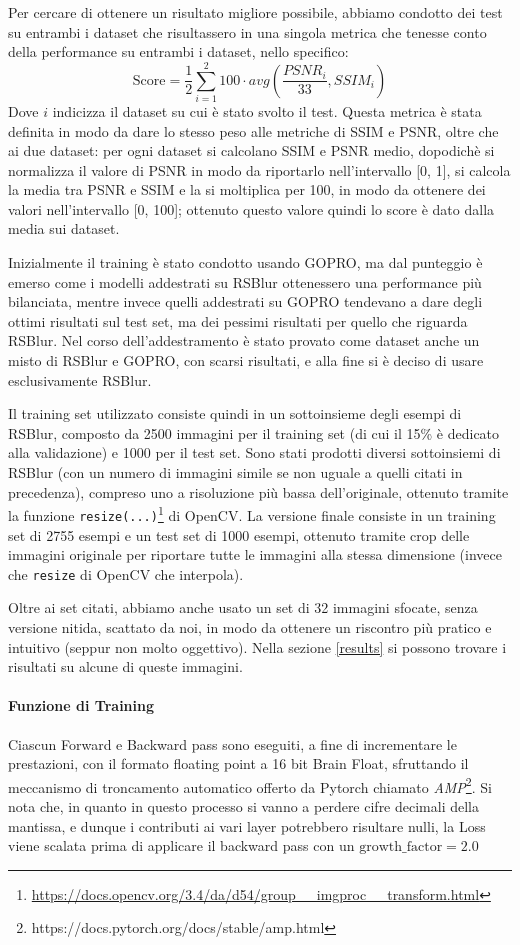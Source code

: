 \documentclass[a4paper,10pt,twocolumn]{article}
\begin{document}
Per cercare di ottenere un risultato migliore possibile, abbiamo condotto dei test su entrambi i dataset che risultassero in una singola metrica che tenesse conto della performance su entrambi
i dataset, nello specifico:
\[ \text{Score} = \frac{1}{2}\sum_{i=1}^2 100 \cdot avg(\frac{PSNR_i}{33}, SSIM_i)\]
Dove $i$ indicizza il dataset su cui è stato svolto il test. Questa metrica è stata definita in modo da dare lo stesso peso alle metriche di SSIM e PSNR, oltre che ai due dataset: per ogni dataset si calcolano SSIM e PSNR medio, dopodichè si normalizza
il valore di PSNR in modo da riportarlo nell'intervallo [0, 1], si calcola la media tra PSNR e SSIM e la si moltiplica per 100, in modo da ottenere dei valori nell'intervallo [0, 100]; ottenuto questo valore quindi lo score è dato dalla media sui dataset.

Inizialmente il training è stato condotto usando GOPRO, ma dal punteggio è emerso come i modelli addestrati su RSBlur ottenessero una performance più bilanciata, mentre invece quelli addestrati su GOPRO tendevano a dare degli ottimi risultati sul test set, ma dei pessimi
risultati per quello che riguarda RSBlur. Nel corso dell'addestramento è stato provato come dataset anche un misto di RSBlur e GOPRO, con scarsi risultati, e alla fine si è deciso di usare esclusivamente RSBlur.

Il training set utilizzato consiste quindi in un sottoinsieme degli esempi di RSBlur, composto da 2500 immagini per il training set (di cui il 15\% è dedicato alla validazione) e 1000 per il test set. Sono stati prodotti diversi sottoinsiemi di RSBlur (con un numero di immagini
simile se non uguale a quelli citati in precedenza), compreso uno a risoluzione più bassa dell'originale, ottenuto tramite la funzione \texttt{resize(...)}\footnote{\url{https://docs.opencv.org/3.4/da/d54/group__imgproc__transform.html}} di OpenCV.
La versione finale consiste in un training set di 2755 esempi e un test set di 1000 esempi, ottenuto tramite crop delle immagini originale per riportare tutte le immagini alla stessa dimensione (invece che \texttt{resize} di OpenCV che interpola).

Oltre ai set citati, abbiamo anche usato un set di 32 immagini sfocate, senza versione nitida, scattato da noi, in modo da ottenere un riscontro più pratico e intuitivo (seppur non molto oggettivo). Nella sezione \ref{results} si possono trovare i risultati su alcune di queste immagini.

\paragraph{Funzione di Training}
Ciascun Forward e Backward pass sono eseguiti, a fine di incrementare le prestazioni, con il formato floating point a 16 bit Brain Float,
sfruttando il meccanismo di troncamento automatico offerto da Pytorch chiamato \textit{AMP}\footnote{https://docs.pytorch.org/docs/stable/amp.html}.
Si nota che, in quanto in questo processo si vanno a perdere cifre decimali della mantissa, e dunque i contributi ai vari layer potrebbero risultare nulli,
la Loss viene scalata prima di applicare il backward pass con un $\mathrm{growth\_factor} = 2.0$
\end{document}
